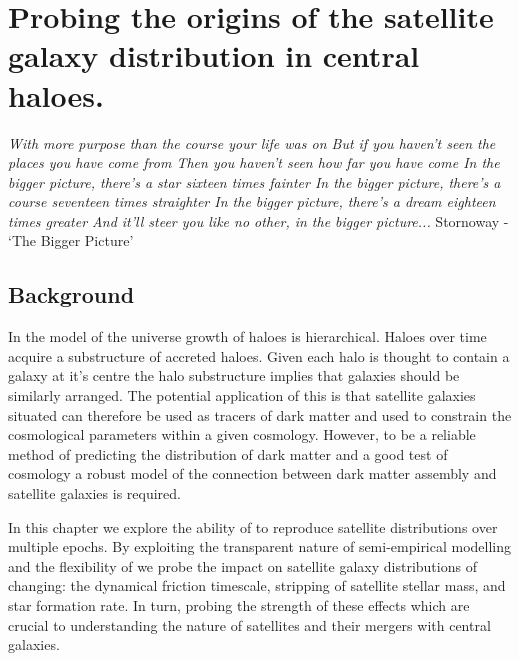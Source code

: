 
\chapter{Probing the origins of the satellite galaxy distribution in central haloes.} 
\label{Chapter:GalDist}
\begin{center}
    \textit{With more purpose than the course your life was on \newline
    But if you haven't seen the places you have come from\newline
    Then you haven't seen how far you have come\newline
    In the bigger picture, there's a star sixteen times fainter\newline
    In the bigger picture, there's a course seventeen times straighter\newline
    In the bigger picture, there's a dream eighteen times greater\newline
    And it'll steer you like no other, in the bigger picture...\newline}
Stornoway - `The Bigger Picture'
\end{center}


\section{Background}
In the \LCDM model of the universe growth of haloes is hierarchical. Haloes over time acquire a substructure of accreted haloes. Given each halo is thought to contain a galaxy at it's centre the halo substructure implies that galaxies should be similarly arranged. The potential application of this is that satellite galaxies situated can therefore be used as tracers of dark matter and used to constrain the cosmological parameters within a given \LCDM cosmology. However, to be a reliable method of predicting the distribution of dark matter and a good test of \LCDM cosmology a robust model of the connection between dark matter assembly and satellite galaxies is required.

In this chapter we explore the ability of \steel to reproduce satellite distributions over multiple epochs. By exploiting the transparent nature of semi-empirical modelling and the flexibility of \steel we probe the impact on satellite galaxy distributions of changing: the dynamical friction timescale, stripping of satellite stellar mass, and star formation rate. In turn, probing the strength of these effects which are crucial to understanding the nature of satellites and their mergers with central galaxies.  

